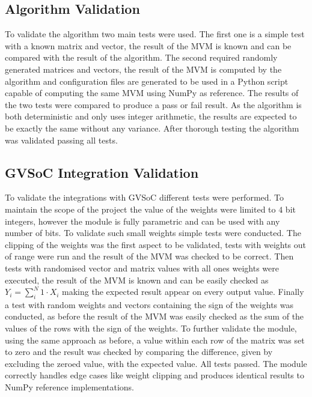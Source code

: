 \subsection{Algorithm Validation}\label{sec:alg_val}
To validate the algorithm two main tests were used.
The first one is a simple test with a known matrix and vector, the result of the MVM is known and can be compared with the result of the algorithm.
The second required randomly generated matrices and vectors, the result of the MVM is computed by the algorithm and configuration files are generated to be used in a Python script capable of computing the same MVM using NumPy as reference.
The results of the two tests were compared to produce a pass or fail result.
As the algorithm is both deterministic and only uses integer arithmetic, the results are expected to be exactly the same without any variance.
After thorough testing the algorithm was validated passing all tests.
\subsection{GVSoC Integration Validation}\label{sec:gvsoc_val}
To validate the integrations with GVSoC different tests were performed.
To maintain the scope of the project the value of the weights were limited to $4$ bit integers, however the module is fully parametric and can be used with any number of bits.
To validate such small weights simple tests were conducted.
The clipping of the weights was the first aspect to be validated, tests with weights out of range were run and the result of the MVM was checked to be correct.
Then tests with randomised vector and matrix values with all ones weights were executed, the result of the MVM is known and can be easily checked as $Y_i=\sum_{i}^{N}1\cdot X_i$ making the expected result appear on every output value.
Finally a test with random weights and vectors containing the sign of the weights was conducted, as before the result of the MVM was easily checked as the sum of the values of the rows with the sign of the weights.
To further validate the module, using the same approach as before, a value within each row of the matrix was set to zero and the result was checked by comparing the difference, given by excluding the zeroed value, with the expected value.
All tests passed. The module correctly handles edge cases like weight clipping and produces identical results to NumPy reference implementations.

